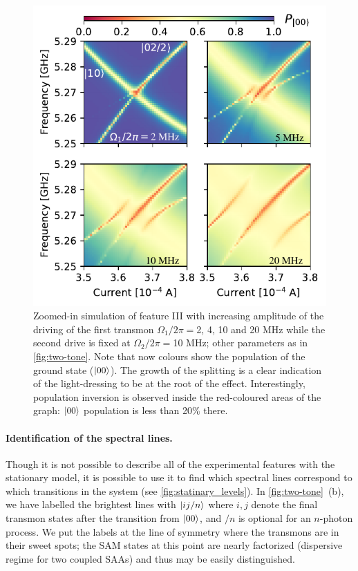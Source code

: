 \documentclass[%
 aip,
 amsmath,amssymb,
 reprint,%
]{revtex4-1}
\begin{document}
\begin{figure}
	\includegraphics[width=\linewidth]{zoom_picture}
	\caption{Zoomed-in simulation of feature III with increasing amplitude of the driving of the first transmon $\Omega_1/2\pi=$2, 4, 10 and 20 MHz while the second drive is fixed at $\Omega_2/2\pi=$10 MHz; other parameters as in \autoref{fig:two-tone}. Note that now colours show the population of the ground state ($\ket{00}$). The growth of the splitting is a clear indication of the light-dressing to be at the root of the effect. Interestingly, population inversion is observed inside the red-coloured areas of the graph: $\ket{00}$ population is less than 20\% there.}
	\label{fig:zoom}
\end{figure}


\paragraph{Identification of the spectral lines.} Though it is not possible to describe all of the experimental features with the stationary model, it is possible to use it to find which spectral lines correspond to which transitions in the system (see \autoref{fig:statinary_levels}). In \autoref{fig:two-tone}~(b), we have labelled the brightest lines with $\ket{ij/n}$ where $i,j$ denote the final transmon states after the transition from $\ket{00}$, and $/n$ is optional for an $n$-photon process. We put the labels at the line of symmetry where the transmons are in their sweet spots; the SAM states at this point are nearly factorized (dispersive regime for two coupled SAAs) and thus may be easily distinguished.
\end{document}
